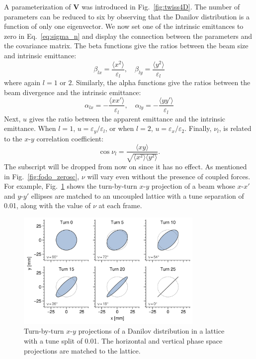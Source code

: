A parameterization of $\mathbf{V}$ was introduced in Fig.~\ref{fig:twiss4D}. The number of parameters can be reduced to six by observing that the Danilov distribution is a function of only one eigenvector. We now set one of the intrinsic emittances to zero in Eq.~\eqref{eq:sigma_n} and display the connection between the parameters and the covariance matrix. The beta functions give the ratios between the beam size and intrinsic emittance:
%
\begin{equation}
    \beta_{lx} = \frac{\langle{x^2}\rangle}{\varepsilon_l}, \quad
    \beta_{ly} = \frac{\langle{y^2}\rangle}{\varepsilon_l}
\end{equation}
%
where again $l = 1$ or $2$. Similarly, the alpha functions give the ratios between the beam divergence and the intrinsic emittance:
%
\begin{equation}
    \alpha_{lx} = -\frac{\langle{xx'}\rangle}{\varepsilon_l}, \quad
    \alpha_{ly} = -\frac{\langle{yy'}\rangle}{\varepsilon_l}
\end{equation}
%
Next, $u$ gives the ratio between the apparent emittance and the intrinsic emittance. When $l = 1$, $u = \varepsilon_y / \varepsilon_l$, or when $l = 2$, $u = \varepsilon_x / \varepsilon_2$. Finally, $\nu_l$, is related to the $x$-$y$ correlation coefficient:
%
\begin{equation}
    \cos\nu_l = \frac{\langle{xy}\rangle}{\sqrt{\langle{x^2}\rangle\langle{y^2}\rangle}}.
\end{equation}
%
The subscript will be dropped from now on since it has no effect. As mentioned in Fig.~\ref{fig:fodo_zerosc}, $\nu$ will vary even without the presence of coupled forces. For example, Fig.~\ref{fig:splittunes_tbt} shows the turn-by-turn $x$-$y$ projection of a beam whose $x$-$x'$ and $y$-$y'$ ellipses are matched to an uncoupled lattice with a tune separation of 0.01, along with the value of $\nu$ at each frame. 
%
\begin{figure}[!p]
    \centering
    \includegraphics[width=0.8\textwidth]{Images/chapter2/splittunes_tbt.png}
    \caption{Turn-by-turn $x$-$y$ projections of a Danilov distribution in a lattice with a tune split of 0.01. The horizontal and vertical phase space projections are matched to the lattice.}
    \label{fig:splittunes_tbt}
\end{figure}
